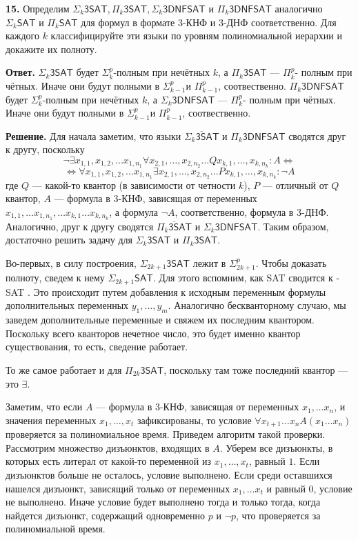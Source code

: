 \textbf{15.}
Определим $\Sigma_k\mathsf{3SAT}, \Pi_k\mathsf{3SAT}, \Sigma_k\mathsf{3DNFSAT}$ и $\Pi_k\mathsf{3DNFSAT}$ аналогично $\Sigma_k \mathsf{SAT}$ и $\Pi_k \mathsf{SAT}$ для формул в формате 3-КНФ и 3-ДНФ соответственно. Для каждого $k$ классифицируйте эти языки по уровням полиномиальной иерархии и докажите их полноту.

\textbf{Ответ.} 
$\Sigma_k\mathsf{3SAT}$ будет $\Sigma_k^p$-полным при нечётных $k$, а  $\Pi_k\mathsf{3SAT}$ — $\Pi_k^p$-
полным при чётных. Иначе они будут полными в $\Sigma_{k-1}^p$и $\Pi_{k-1}^p$, соотвественно. $\Pi_k\mathsf{3DNFSAT}$ будет $\Sigma_k^p$-полным при нечётных $k$, а  $\Sigma_k\mathsf{3DNFSAT}$ — $\Pi_k^p$-
полным при чётных. Иначе они будут полными в $\Sigma_{k-1}^p$и $\Pi_{k-1}^p$, соотвественно.

\textbf{Решение.} 
Для начала заметим, что языки $\overline{\Sigma_k\mathsf{3SAT}}$ и $\Pi_k\mathsf{3DNFSAT}$ сводятся друг к другу, поскольку 
$$
\neg \exists x_{1,1}, x_{1, 2}, \ldots x_{1, n_1} \forall x_{2, 1}, \ldots, x_{2, n_2} \ldots Q x_{k, 1}, \ldots,x_{k, n_k}\colon A \Longleftrightarrow$$ $$ \Longleftrightarrow \forall x_{1,1}, x_{1, 2}, \ldots x_{1, n_1} \exists x_{2, 1}, \ldots, x_{2, n_2} \ldots P x_{k, 1}, \ldots,x_{k, n_k}\colon \neg A
$$
где $Q$ --- какой-то квантор (в зависимости от четности $k$), $P$ --- отличный от $Q$ квантор, $A$ --- формула в 3-КНФ, зависящая от переменных $x_{1, 1}, \ldots x_{1, n_1}, \ldots x_{k, 1} \ldots x_{k, n_k}$, а формула $\neg A$, соответственно, формула в 3-ДНФ.
Аналогично, друг к другу сводятся $\overline{\Pi_k\mathsf{3SAT}}$ и $\Sigma_k\mathsf{3DNFSAT}$. Таким образом, достаточно решить задачу для $\Sigma_k\mathsf{3SAT}$ и $\Pi_k\mathsf{3SAT}$.

Во-первых, в силу построения, $\Sigma_{2k+1}\mathsf{3SAT}$ лежит в 
$\Sigma_{2k+1}^p$. Чтобы доказать полноту, сведем к нему $\Sigma_{2k+1}\mathsf{SAT}$. Для этого вспомним, как \sf SAT \rm сводится к -SAT \rm. Это происходит путем добавления к исходным переменным формулы дополнительных переменных $y_1, \ldots, y_m$. Аналогично бескванторному случаю, мы заведем дополнительные переменные и свяжем их последним квантором. Поскольку всего кванторов нечетное число, это будет именно квантор существования, то есть, сведение работает.

То же самое работает и для $\Pi_{2k}\mathsf{3SAT}$, поскольку там тоже последний квантор --- это $\exists$.

Заметим, что если $A$ --- формула в 3-КНФ, зависящая от переменных $x_1, \ldots x_n$, и значения переменных $x_1, \ldots, x_t$ зафиксированы, то условие $\forall x_{t+1} \ldots x_n A(x_1 \ldots x_n)$ проверяется за полиномиальное время. Приведем алгоритм такой проверки. Рассмотрим множество дизъюнктов, входящих в $A$. Уберем все дизъюнкты, в которых есть литерал от какой-то переменной из $x_1, \ldots, x_t$, равный $1$. Если дизъюнктов больше не осталось, условие выполнено. Если среди оставшихся нашелся дизъюнкт, зависящий только от переменных $x_1, \ldots x_t$ и равный 0, условие не выполнено. Иначе условие будет выполнено тогда и только тогда, когда найдется дизъюнкт, содержащий одновременно $p$ и $\neg p$, что проверяется за полиномиальной время. 

